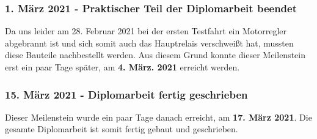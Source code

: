 \subsubsection*{1. März 2021 - Praktischer Teil der Diplomarbeit beendet}
Da uns leider am 28. Februar 2021 bei der ersten Testfahrt ein Motorregler abgebrannt ist und sich somit auch das Hauptrelais verschweißt hat, mussten
diese Bauteile nachbestellt werden. Aus diesem Grund konnte dieser Meilenstein erst ein paar Tage später, am \textbf{4. März. 2021} erreicht werden.  

\subsubsection*{15. März 2021 - Diplomarbeit fertig geschrieben}
Dieser Meilenstein wurde ein paar Tage danach erreicht, am \textbf{17. März 2021}. Die gesamte Diplomarbeit ist somit fertig gebaut und geschrieben. 

